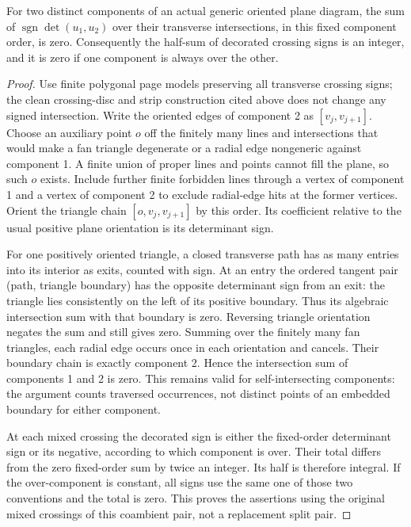 \begin{lemma}\label{mp:zero-link}
For two distinct components of an actual generic oriented plane diagram,
the sum of $\operatorname{sgn}\det(u_1,u_2)$ over their transverse
intersections, in this fixed component order, is zero. Consequently
the half-sum of decorated crossing signs is an integer, and it is zero
if one component is always over the other.
\end{lemma}
\begin{proof}
Use finite polygonal page models preserving all transverse crossing
signs; the clean crossing-disc and strip construction cited above
does not change any signed intersection. Write the oriented edges of
component 2 as $[v_j,v_{j+1}]$. Choose an auxiliary point $o$ off the
finitely many lines and intersections that would make a fan triangle
degenerate or a radial edge nongeneric against component 1. A finite
union of proper lines and points cannot fill the plane, so such $o$
exists. Include further finite forbidden lines through a vertex of
component 1 and a vertex of component 2 to exclude radial-edge hits
at the former vertices. Orient the triangle chain
$[o,v_j,v_{j+1}]$ by this order. Its coefficient relative to the usual
positive plane orientation is its determinant sign.

For one positively oriented triangle, a closed transverse path has
as many entries into its interior as exits, counted with sign. At an
entry the ordered tangent pair (path, triangle boundary) has the
opposite determinant sign from an exit: the triangle lies consistently
on the left of its positive boundary. Thus its algebraic intersection
sum with that boundary is zero. Reversing triangle orientation negates
the sum and still gives zero. Summing over the finitely many fan
triangles, each radial edge occurs once in each orientation and
cancels. Their boundary chain is exactly component 2. Hence the
intersection sum of components 1 and 2 is zero. This remains valid for
self-intersecting components: the argument counts traversed occurrences,
not distinct points of an embedded boundary for either component.

At each mixed crossing the decorated sign is either the fixed-order
determinant sign or its negative, according to which component is
over. Their total differs from the zero fixed-order sum by twice an
integer. Its half is therefore integral. If the over-component is
constant, all signs use the same one of those two conventions and
the total is zero. This proves the assertions using the original mixed
crossings of this coambient pair, not a replacement split pair.
\end{proof}

